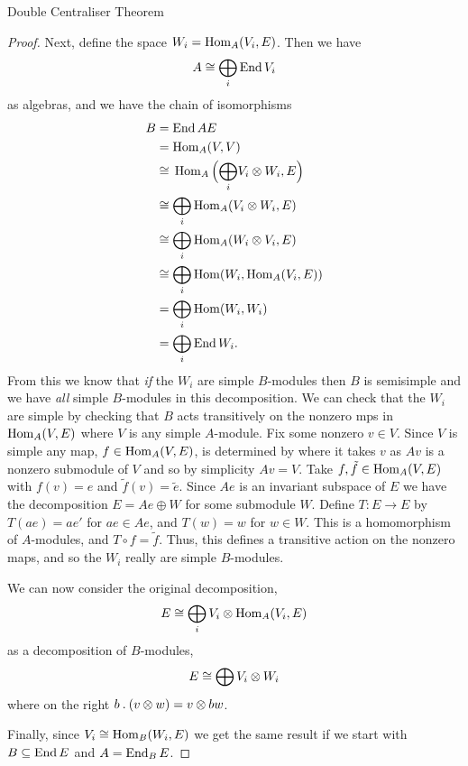 \begin{thm}{Double Centraliser Theorem}{}
\begin{proof}
        Next, define the space \(W_i = \operatorname{Hom}_A(V_i, E)\).
        Then we have
        \begin{equation}
            A \cong \bigoplus_i \operatorname{End} V_i
        \end{equation}
        as algebras, and we have the chain of isomorphisms
        \begin{align}
            B &= \operatorname{End} A E\\
            &= \operatorname{Hom}_A(V, V)\\
            &\cong \vphantom{\bigoplus_i}\operatorname{Hom}_A\left( \vphantom{\bigoplus}\smash{\bigoplus_{i}} V_i \otimes W_i, E \right)\\
            &\cong \bigoplus_i \operatorname{Hom}_A(V_i \otimes W_i, E)\\
            &\cong \bigoplus_i \operatorname{Hom}_A(W_i \otimes V_i, E)\\
            &\cong \bigoplus_i \operatorname{Hom}(W_i, \operatorname{Hom}_A(V_i, E))\\
            &= \bigoplus_i \operatorname{Hom}(W_i, W_i)\\
            &= \bigoplus_i \operatorname{End} W_i.
        \end{align}
        From this we know that \emph{if} the \(W_i\) are simple \(B\)-modules then \(B\) is semisimple and we have \emph{all} simple \(B\)-modules in this decomposition.
        We can check that the \(W_i\) are simple by checking that \(B\) acts transitively on the nonzero mps in \(\operatorname{Hom}_A(V, E)\) where \(V\) is any simple \(A\)-module.
        Fix some nonzero \(v \in V\).
        Since \(V\) is simple any map, \(f \in \operatorname{Hom}_A(V, E)\), is determined by where it takes \(v\) as \(Av\) is a nonzero submodule of \(V\) and so by simplicity \(Av = V\).
        Take \(f, \tilde{f} \in \operatorname{Hom}_A(V, E)\) with \(f(v) = e\) and \(\tilde{f}(v) = \tilde{e}\).
        Since \(Ae\) is an invariant subspace of \(E\) we have the decomposition \(E = Ae \oplus W\) for some submodule \(W\).
        Define \(T \colon E \to E\) by \(T(ae) = ae'\) for \(ae \in Ae\), and \(T(w) = w\) for \(w \in W\).
        This is a homomorphism of \(A\)-modules, and \(T \circ f = \tilde{f}\).
        Thus, this defines a transitive action on the nonzero maps, and so the \(W_i\) really are simple \(B\)-modules.
        
        We can now consider the original decomposition,
        \begin{equation}
            E \cong \bigoplus_i V_i \otimes \operatorname{Hom}_A(V_i, E)
        \end{equation}
        as a decomposition of \(B\)-modules,
        \begin{equation}
            E \cong \bigoplus V_i \otimes W_i
        \end{equation}
        where on the right \(b \mathbin{.} (v \otimes w) = v \otimes bw\).
        
        Finally, since \(V_i \cong \operatorname{Hom}_B(W_i, E)\) we get the same result if we start with \(B \subseteq \operatorname{End} E\) and \(A = \operatorname{End}_B E\).
    \end{proof}
\end{thm}


